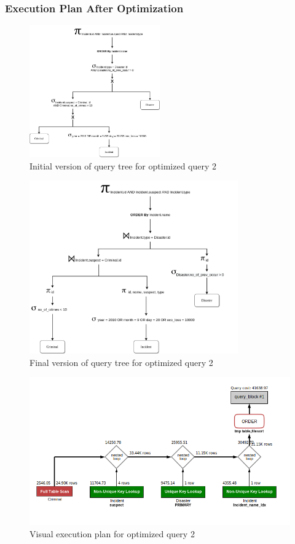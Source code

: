 \subsubsection{Execution Plan After Optimization}
\begin{figure}[H]
    \centering
    \includegraphics[width=0.5\textwidth]{images/query_trees/query2-optimized-initial-version.png}
    \caption{Initial version of query tree for optimized query 2}
\end{figure}
\begin{figure}[H]
    \centering
    \includegraphics[width=0.8\textwidth]{images/query_trees/query2-optimized-final-version.png}
    \caption{Final version of query tree for optimized query 2}
\end{figure}
\begin{figure}[H]
    \centering
    \includegraphics[width=\textwidth]{images/execution_plans/q2-4-new.png}
    \caption{Visual execution plan for optimized query 2}
\end{figure}

